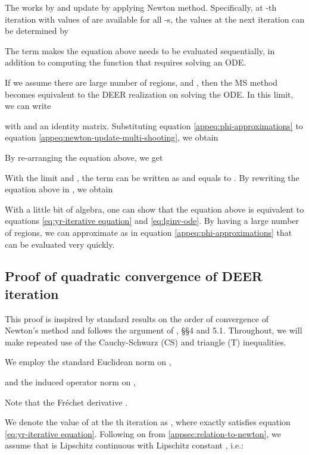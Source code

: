 The works by \cite{chartier1993parallel} and \cite{massaroli2021differentiablemultipleshooting} update  by applying Newton method.
Specifically, at -th iteration with values of  are available for all -s, the values at the next iteration can be determined by \citep{massaroli2021differentiablemultipleshooting}

The term  makes the equation above needs to be evaluated sequentially, in addition to computing the function  that requires solving an ODE.

If we assume there are large number of regions,  and , then the MS method becomes equivalent to the DEER realization on solving the ODE.
In this limit, we can write

with  and  an identity matrix.
Substituting equation \ref{appeq:phi-approximations} to equation \ref{appeq:newton-update-multi-shooting}, we obtain

By re-arranging the equation above, we get

With the limit  and , the term  can be written as  and  equals to .
By rewriting the equation above in , we obtain

With a little bit of algebra, one can show that the equation above is equivalent to equations \ref{eq:yr-iterative equation} and \ref{eq:lginv-ode}.
By having a large number of regions, we can approximate  as in equation \ref{appeq:phi-approximations} that can be evaluated very quickly.

\subsection{Proof of quadratic convergence of DEER iteration}
\label{appsec:proof-of-quadratic-convergence}

This proof is inspired by standard results on the order of convergence of Newton's method and follows the argument of \cite{kelley1995iterative}, \S\S4 and 5.1. Throughout, we will make repeated use of the Cauchy-Schwarz (CS) and triangle (T) inequalities. 

We employ the standard Euclidean norm on ,

and the induced operator norm on ,

Note that the Fr\'{e}chet derivative .

We denote the value of  at the th iteration as , where  exactly satisfies equation \ref{eq:yr-iterative equation}. Following on from \ref{appsec:relation-to-newton}, we assume that  is Lipschitz continuous with Lipschitz constant , i.e.:

